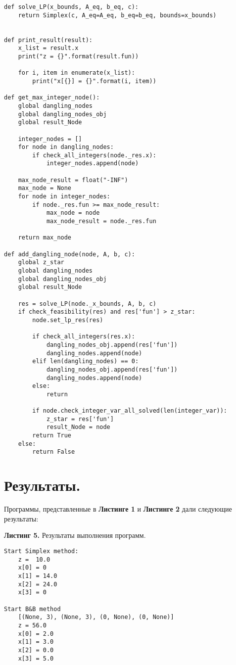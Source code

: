\documentclass[a4paper, 12pt]{article}   	%
\begin{document}
\begin{verbatim}
def solve_LP(x_bounds, A_eq, b_eq, c):
	return Simplex(c, A_eq=A_eq, b_eq=b_eq, bounds=x_bounds)


def print_result(result):
	x_list = result.x
	print("z = {}".format(result.fun))

	for i, item in enumerate(x_list):
		print("x[{}] = {}".format(i, item))

def get_max_integer_node():
	global dangling_nodes
	global dangling_nodes_obj
	global result_Node

	integer_nodes = []
	for node in dangling_nodes:
		if check_all_integers(node._res.x):
			integer_nodes.append(node)

	max_node_result = float("-INF")
	max_node = None
	for node in integer_nodes:
		if node._res.fun >= max_node_result:
			max_node = node
			max_node_result = node._res.fun

	return max_node

def add_dangling_node(node, A, b, c):
	global z_star
	global dangling_nodes
	global dangling_nodes_obj
	global result_Node

	res = solve_LP(node._x_bounds, A, b, c)
	if check_feasibility(res) and res['fun'] > z_star:
		node.set_lp_res(res)

		if check_all_integers(res.x):
			dangling_nodes_obj.append(res['fun'])
			dangling_nodes.append(node)
		elif len(dangling_nodes) == 0:
			dangling_nodes_obj.append(res['fun'])
			dangling_nodes.append(node)
		else:
			return

		if node.check_integer_var_all_solved(len(integer_var)):
			z_star = res['fun']
			result_Node = node
		return True
	else:
		return False
\end{verbatim}

\newpage

\section{Результаты.}
    Программы, представленные в \textbf{Листинге 1} и \textbf{Листинге 2} дали следующие результаты:
    
    \textbf{Листинг 5.} Результаты выполнения программ.
    \begin{verbatim}
Start Simplex method:
    z =  10.0
    x[0] = 0
    x[1] = 14.0
    x[2] = 24.0
    x[3] = 0

Start B&B method
    [(None, 3), (None, 3), (0, None), (0, None)]
    z = 56.0
    x[0] = 2.0
    x[1] = 3.0
    x[2] = 0.0
    x[3] = 5.0
\end{verbatim}
\end{document}
